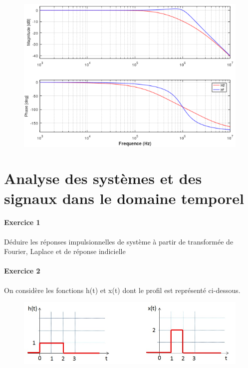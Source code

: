 \documentclass[11pt]{report}
\begin{document}
	\begin{figure}[h!]
		\centering
		\includegraphics[scale=0.6]{images/Effet_cascade_filtre_RC.png} 
	\end{figure}
	
	 
	
	
	
	
	
	
	
	\vspace{1\baselineskip}
	
	
	\newpage
	
	\chapter{Analyse des systèmes et des signaux dans le domaine temporel}
	
	\subsubsection{Exercice 1}
	
	Déduire les réponses impulsionnelles de système à partir de transformée de Fourier, Laplace et de réponse indicielle
		
	\subsubsection{Exercice 2}
	
	On considère les fonctions h(t) et x(t) dont le profil est représenté ci-dessous.
	\begin{figure}[h!]
		\centering
		\includegraphics[scale=0.5]{images/Courbes_TD_Convolution_2.jpg} 
	\end{figure}
	
\end{document}
